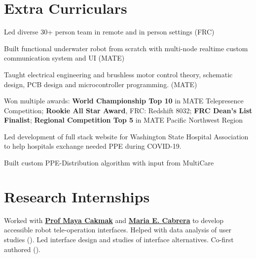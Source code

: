 \documentclass[]{deedy-resume-openfont}
\begin{document}
\begin{paracol}{2}

\section{Extra Curriculars}
\begin{tightemize}
\item Led diverse 30+ person team in remote and in person settings (FRC)
\item Built functional underwater robot from scratch with multi-node realtime custom communication system and UI (MATE)
\item Taught electrical engineering and brushless motor control theory, schematic design, PCB design and microcontroller programming. (MATE)
\item Won multiple awards: \textbf{World Championship Top 10} in MATE  Telepresence Competition; \textbf{Rookie All Star Award}, FRC: Redshift 8032; \textbf{FRC Dean's List Finalist}; \textbf{Regional Competition Top 5} in MATE Pacific Northwest Region 
\end{tightemize}
\sectionsep

\begin{tightemize}
\item Led development of full stack website for Washington State Hospital Association to help hospitals exchange needed PPE during COVID-19.
\item Built custom PPE-Distribution algorithm with input from MultiCare
\end{tightemize}
\sectionsep


\section{Research Internships}
Worked with \textbf{\href{https://homes.cs.washington.edu/~mcakmak/}{Prof Maya Cakmak}} and \textbf{\href{https://marucabrera.wixsite.com/homepage}{Maria E. Cabrera}} to develop accessible robot tele-operation interfaces. Helped with data analysis of user studies (\cite{CabreraBDC21}). Led interface design and studies of interface alternatives. Co-first authored  (\cite{CabreraDKBC21}).
\sectionsep


\end{paracol}
\end{document}

